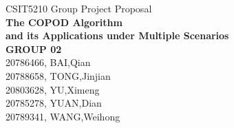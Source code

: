 \documentclass[12pt, a4paper, oneside]{article}
\begin{document}
  \begin{titlepage}
    \vspace*{\fill}
    \begin{center}
      {\huge CSIT5210 Group Project Proposal}\\[.5cm]
      \textbf{\huge The COPOD Algorithm \\ and its Applications under Multiple Scenarios}\\[2cm]
      \textbf{GROUP 02}\\
      {
20786466, BAI,Qian\\
20788658, TONG,Jinjian \\
20803628, YU,Ximeng\\
20785278, YUAN,Dian \\
20789341, WANG,Weihong }\\[5cm]
    \end{center}
    \vspace*{\fill}
  \end{titlepage}
\end{document}
